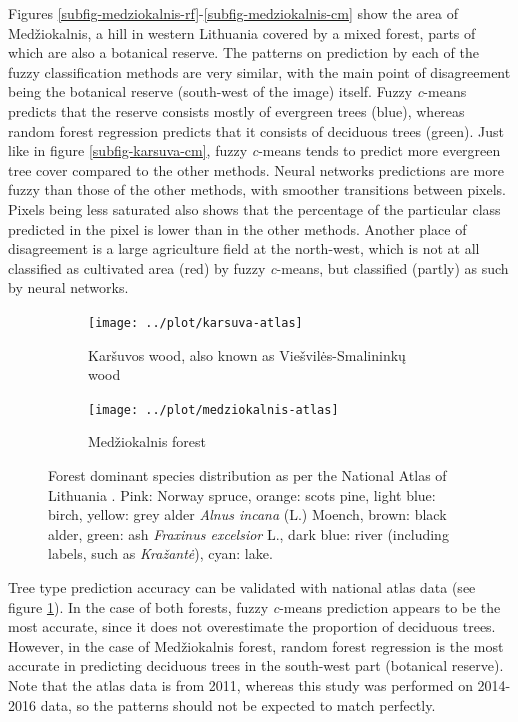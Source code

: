 \documentclass[a4paper,12pt]{scrbook}
\begin{document}
Figures \ref{subfig-medziokalnis-rf}-\ref{subfig-medziokalnis-cm} show the area of Med\v{z}iokalnis, a hill in western Lithuania covered by a mixed forest, parts of which are also a botanical reserve. The patterns on prediction by each of the fuzzy classification methods are very similar, with the main point of disagreement being the botanical reserve (south-west of the image) itself. Fuzzy \textit{c}-means predicts that the reserve consists mostly of evergreen trees (blue), whereas random forest regression predicts that it consists of deciduous trees (green). Just like in figure \ref{subfig-karsuva-cm}, fuzzy \textit{c}-means tends to predict more evergreen tree cover compared to the other methods. Neural networks predictions are more fuzzy than those of the other methods, with smoother transitions between pixels. Pixels being less saturated also shows that the percentage of the particular class predicted in the pixel is lower than in the other methods. Another place of disagreement is a large agriculture field at the north-west, which is not at all classified as cultivated area (red) by fuzzy \textit{c}-means, but classified (partly) as such by neural networks.

\begin{figure}
  \centering
  \begin{subfigure}[b]{0.48\textwidth}
    \texttt{[image: ../plot/karsuva-atlas]}
    \caption{Kar\v{s}uvos wood, also known as Vie\v{s}vil\.{e}s-Smalinink\k{u} wood}
  \end{subfigure} \hfill
  \begin{subfigure}[b]{0.48\textwidth}
    \texttt{[image: ../plot/medziokalnis-atlas]}
    \caption{Med\v{z}iokalnis forest}
  \end{subfigure}
  \caption{Forest dominant species distribution as per the National Atlas of Lithuania \citep{treeatlas2011}. Pink: Norway spruce, orange: scots pine, light blue: birch, yellow: grey alder \textit{Alnus incana} (L.) Moench, brown: black alder, green: ash \textit{Fraxinus excelsior} L., dark blue: river (including labels, such as \textit{Kra\v{z}ant\.{e}}), cyan: lake.}
  \label{fig-atlas-forest}
\end{figure}

Tree type prediction accuracy can be validated with national atlas data (see figure \ref{fig-atlas-forest}). In the case of both forests, fuzzy \textit{c}-means prediction appears to be the most accurate, since it does not overestimate the proportion of deciduous trees. However, in the case of Med\v{z}iokalnis forest, random forest regression is the most accurate in predicting deciduous trees in the south-west part (botanical reserve). Note that the atlas data is from 2011, whereas this study was performed on 2014-2016 data, so the patterns should not be expected to match perfectly.
\end{document}
